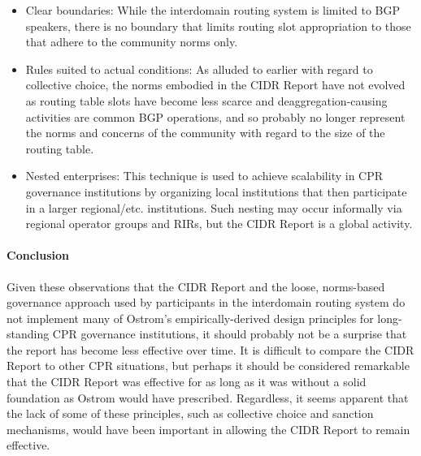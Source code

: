 \begin{itemize}

\item{Clear boundaries: While the interdomain routing system is limited to BGP
speakers, there is no boundary that limits routing slot appropriation to those
that adhere to the community norms only.}

\item{Rules suited to actual conditions: As alluded to earlier with regard to
collective choice, the norms embodied in the CIDR Report have not evolved as
routing table slots have become less scarce and deaggregation-causing
activities are common BGP operations, and so probably no longer represent the
norms and concerns of the community with regard to the size of the routing
table.}

\item{Nested enterprises: This technique is used to achieve scalability in CPR
governance institutions by organizing local institutions that then participate
in a larger regional/etc. institutions. Such nesting may occur informally via
regional operator groups and RIRs, but the CIDR Report is a global activity.}

\end{itemize}

\paragraph{Conclusion}

Given these observations that the CIDR Report and the loose, norms-based
governance approach used by participants in the interdomain routing system do
not implement many of Ostrom's empirically-derived design principles for
long-standing CPR governance institutions, it should probably not be a surprise
that the report has become less effective over time. It is difficult to compare
the CIDR Report to other CPR situations, but perhaps it should be considered
remarkable that the CIDR Report was effective for as long as it was without a
solid foundation as Ostrom would have prescribed. Regardless, it seems apparent
that the lack of some of these principles, such as collective choice and
sanction mechanisms, would have been important in allowing the CIDR Report to
remain effective.


